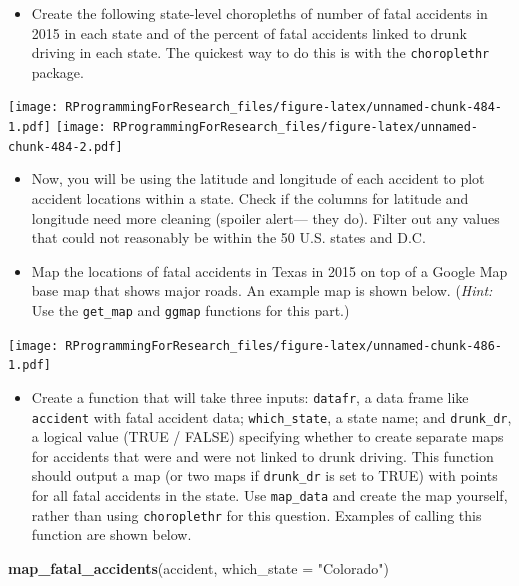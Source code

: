 \documentclass[]{book}
\makeatletter
\newenvironment{Shaded}{\begin{snugshade}}{\end{snugshade}}
\newcommand{\KeywordTok}[1]{\textcolor[rgb]{0.13,0.29,0.53}{\textbf{{#1}}}}
\newcommand{\DataTypeTok}[1]{\textcolor[rgb]{0.13,0.29,0.53}{{#1}}}
\newcommand{\StringTok}[1]{\textcolor[rgb]{0.31,0.60,0.02}{{#1}}}
\newcommand{\NormalTok}[1]{{#1}}
\providecommand{\tightlist}{%
  \setlength{\itemsep}{0pt}\setlength{\parskip}{0pt}}
\newenvironment{kframe}{%
\medskip{}
\setlength{\fboxsep}{.8em}
 \def\at@end@of@kframe{}%
 \ifinner\ifhmode%
  \def\at@end@of@kframe{\end{minipage}}%
  \begin{minipage}{\columnwidth}%
 \fi\fi%
 \def\FrameCommand##1{\hskip\@totalleftmargin \hskip-\fboxsep
 \colorbox{shadecolor}{##1}\hskip-\fboxsep
     \hskip-\linewidth \hskip-\@totalleftmargin \hskip\columnwidth}%
 \MakeFramed {\advance\hsize-\width
   \@totalleftmargin\z@ \linewidth\hsize
   \@setminipage}}%
 {\par\unskip\endMakeFramed%
 \at@end@of@kframe}
\renewenvironment{Shaded}{\begin{kframe}}{\end{kframe}}
\makeatother
\begin{document}
\begin{itemize}
\tightlist
\item
  Create the following state-level choropleths of number of fatal
  accidents in 2015 in each state and of the percent of fatal accidents
  linked to drunk driving in each state. The quickest way to do this is
  with the \texttt{choroplethr} package.
\end{itemize}

\texttt{[image: RProgrammingForResearch\_files/figure-latex/unnamed-chunk-484-1.pdf]}
\texttt{[image: RProgrammingForResearch\_files/figure-latex/unnamed-chunk-484-2.pdf]}

\begin{itemize}
\item
  Now, you will be using the latitude and longitude of each accident to
  plot accident locations within a state. Check if the columns for
  latitude and longitude need more cleaning (spoiler alert--- they do).
  Filter out any values that could not reasonably be within the 50 U.S.
  states and D.C.
\item
  Map the locations of fatal accidents in Texas in 2015 on top of a
  Google Map base map that shows major roads. An example map is shown
  below. (\emph{Hint:} Use the \texttt{get\_map} and \texttt{ggmap}
  functions for this part.)
\end{itemize}

\texttt{[image: RProgrammingForResearch\_files/figure-latex/unnamed-chunk-486-1.pdf]}

\begin{itemize}
\tightlist
\item
  Create a function that will take three inputs: \texttt{datafr}, a data
  frame like \texttt{accident} with fatal accident data;
  \texttt{which\_state}, a state name; and \texttt{drunk\_dr}, a logical
  value (TRUE / FALSE) specifying whether to create separate maps for
  accidents that were and were not linked to drunk driving. This
  function should output a map (or two maps if \texttt{drunk\_dr} is set
  to TRUE) with points for all fatal accidents in the state. Use
  \texttt{map\_data} and create the map yourself, rather than using
  \texttt{choroplethr} for this question. Examples of calling this
  function are shown below.
\end{itemize}

\begin{Shaded}
\begin{Highlighting}[]
\KeywordTok{map_fatal_accidents}\NormalTok{(accident, }\DataTypeTok{which_state =} \StringTok{"Colorado"}\NormalTok{)}
\end{Highlighting}
\end{Shaded}
\end{document}
